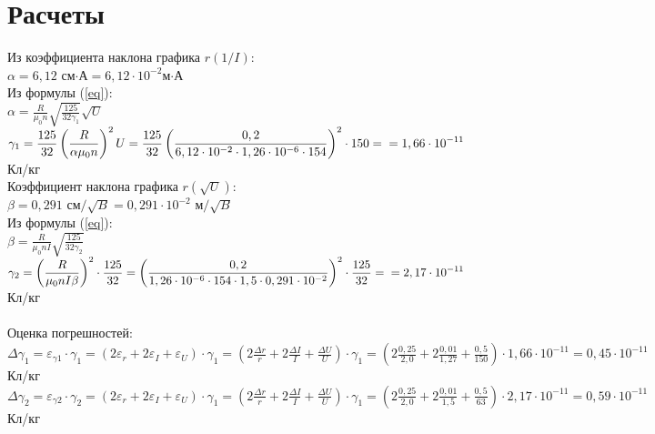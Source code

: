\documentclass[12pt]{article}
\begin{document}
	\section{Расчеты}
	Из коэффициента наклона графика $r(1/I)$:\\
	$\displaystyle\alpha = 6,12$ см$\cdot$А$=6,12\cdot10^{-2}$м$\cdot$А\\
	Из формулы (\ref{eq}):\\
	$\displaystyle\alpha = \frac{R}{\mu_0n}\sqrt{\frac{125}{32\gamma_1}}\sqrt{U}$\\
	$\displaystyle\gamma_1=\frac{125}{32}\left(\frac{R}{\alpha\mu_0n}\right)^2U=\frac{125}{32}\left(\frac{0,2}{6,12\cdot10^{-2}\cdot1,26\cdot10^{-6}\cdot154}\right)^2\cdot 150=\\=1,66\cdot10^{-11}$Кл/кг\\
	Коэффициент наклона графика $r(\sqrt{U})$:\\
	$\displaystyle\beta=0,291$ см$/\sqrt{B}=0,291\cdot10^{-2}$ м$/\sqrt{B}$\\
	Из формулы (\ref{eq}):\\
	$\displaystyle\beta=\frac{R}{\mu_0nI}\sqrt{\frac{125}{32\gamma_2}}$\\
	$\displaystyle\gamma_2=\left( \frac{R}{\mu_0nI\beta}\right)^2\cdot\frac{125}{32}=\left(\frac{0,2}{1,26\cdot10^{-6}\cdot154\cdot1,5\cdot0,291\cdot10^{-2}}\right)^2\cdot\frac{125}{32}=\\=2,17\cdot10^{-11}$ Кл/кг\\\\
	Оценка погрешностей:\\
	$\displaystyle\Delta\gamma_1=\varepsilon_{\gamma1}\cdot\gamma_1=(2\varepsilon_r+2\varepsilon_I+\varepsilon_U)\cdot\gamma_1=\left(2\frac{\Delta r}{r}+2\frac{\Delta I}{I}+\frac{\Delta U}{U}\right)\cdot\gamma_1=\left(2\frac{0,25}{2,0}+2\frac{0,01}{1,27}+\frac{0,5}{150}\right)\cdot1,66\cdot10^{-11}=0,45\cdot10^{-11}$ Кл/кг\\
	$\displaystyle\Delta\gamma_2=\varepsilon_{\gamma2}\cdot\gamma_2=(2\varepsilon_r+2\varepsilon_I+\varepsilon_U)\cdot\gamma_1=\left(2\frac{\Delta r}{r}+2\frac{\Delta I}{I}+\frac{\Delta U}{U}\right)\cdot\gamma_1=\left(2\frac{0,25}{2,0}+2\frac{0,01}{1,5}+\frac{0,5}{63}\right)\cdot2,17\cdot10^{-11}=0,59\cdot10^{-11}$ Кл/кг\\
\end{document}
